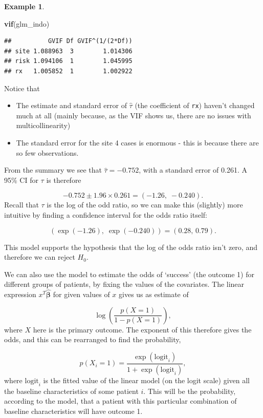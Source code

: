 \documentclass[
  openany]{book}
\newenvironment{Shaded}{\begin{snugshade}}{\end{snugshade}}
\newcommand{\FunctionTok}[1]{\textcolor[rgb]{0.13,0.29,0.53}{\textbf{#1}}}
\newcommand{\NormalTok}[1]{#1}
\providecommand{\tightlist}{%
  \setlength{\itemsep}{0pt}\setlength{\parskip}{0pt}}
\theoremstyle{definition}
\theoremstyle{definition}
\newtheorem{example}{Example}[chapter]
\theoremstyle{definition}
\theoremstyle{definition}
\theoremstyle{remark}
\begin{document}
\begin{example}
\begin{Shaded}
\begin{Highlighting}[]
\FunctionTok{vif}\NormalTok{(glm\_indo)}
\end{Highlighting}
\end{Shaded}

\begin{verbatim}
##          GVIF Df GVIF^(1/(2*Df))
## site 1.088963  3        1.014306
## risk 1.094106  1        1.045995
## rx   1.005852  1        1.002922
\end{verbatim}

Notice that

\begin{itemize}
\tightlist
\item
  The estimate and standard error of \(\hat{\tau}\) (the coefficient of \texttt{rx}) haven't changed much at all (mainly because, as the VIF shows us, there are no issues with multicollinearity)
\item
  The standard error for the site 4 cases is enormous - this is because there are so few observations.
\end{itemize}

From the summary we see that \(\hat\tau = -0.752\), with a standard error of 0.261. A 95\% CI for \(\tau\) is therefore

\[-0.752 \pm 1.96\times 0.261 = \left(-1.26,\;-0.240\right).\]
Recall that \(\tau\) is the log of the odd ratio, so we can make this (slightly) more intuitive by finding a confidence interval for the odds ratio itself:

\[\left(\exp(-1.26),\;\exp(-0.240)\right) = \left(0.28,\,0.79\right).\]

This model supports the hypothesis that the log of the odds ratio isn't zero, and therefore we can reject \(H_0\).
\end{example}

We can also use the model to estimate the odds of `success' (the outcome 1) for different groups of patients, by fixing the values of the covariates. The linear expression \(x^T\hat{\boldsymbol\beta}\) for given values of \(x\) gives us as estimate of

\[\log\left(\frac{p(X=1)}{1-p(X=1)}\right),\]
where \(X\) here is the primary outcome. The exponent of this therefore gives the odds, and this can be rearranged to find the probability,

\[p\left(X_i=1\right) = \frac{\exp(\text{logit}_i)}{1+\exp(\text{logit}_i)}, \]
where \(\text{logit}_i\) is the fitted value of the linear model (on the logit scale) given all the baseline characteristics of some patient \(i\).
This will be the probability, according to the model, that a patient with this particular combination of baseline characteristics will have outcome 1.
\end{document}
